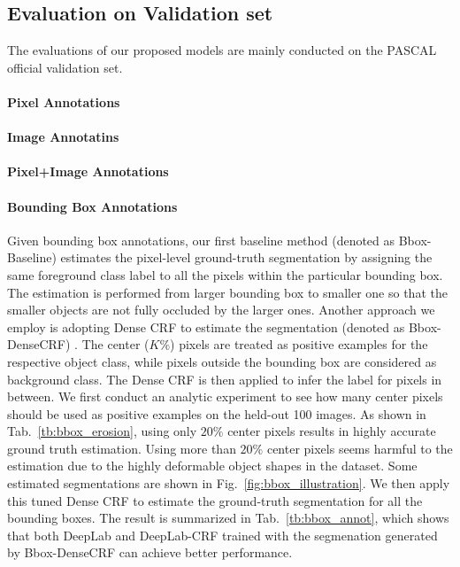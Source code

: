 \subsection{Evaluation on Validation set}
The evaluations of our proposed models are mainly conducted on the PASCAL official validation set. 

\paragraph{Pixel Annotations}
\paragraph{Image Annotatins}
\paragraph{Pixel+Image Annotations}

\paragraph{Bounding Box Annotations} Given bounding box annotations, our first baseline method (denoted as Bbox-Baseline) estimates the pixel-level ground-truth segmentation by assigning the same foreground class label to all the pixels within the particular bounding box. The estimation is performed from larger bounding box to smaller one so that the smaller objects are not fully occluded by the larger ones. Another approach we employ is adopting Dense CRF to estimate the segmentation (denoted as Bbox-DenseCRF) . The center ($K\%$) pixels are treated as positive examples for the respective object class, while pixels outside the bounding box are considered as background class. The Dense CRF is then applied to infer the label for pixels in between. We first conduct an analytic experiment to see how many center pixels should be used as positive examples on the held-out 100 images. As shown in Tab.~\ref{tb:bbox_erosion}, using only $20\%$ center pixels results in highly accurate ground truth estimation. Using more than $20\%$ center pixels seems harmful to the estimation due to the highly deformable object shapes in the dataset. Some estimated segmentations are shown in Fig.~\ref{fig:bbox_illustration}. We then apply this tuned Dense CRF to estimate the ground-truth segmentation for all the bounding boxes. The result is summarized in Tab.~\ref{tb:bbox_annot}, which shows that both DeepLab and DeepLab-CRF trained with the segmenation generated by Bbox-DenseCRF can achieve better performance.



